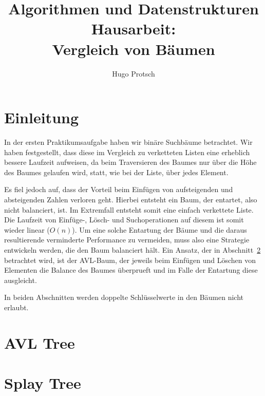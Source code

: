 \documentclass[11pt]{article}
\title{Algorithmen und Datenstrukturen Hausarbeit:\\Vergleich von Bäumen}
\author{Hugo Protsch}
\begin{document}
    \maketitle
    \tableofcontents
    \newpage
    \section{Einleitung}\label{sec:Einleitung}

    In der ersten Praktikumsaufgabe haben wir binäre Suchbäume betrachtet.
    Wir haben festgestellt, dass diese im Vergleich zu verketteten Listen eine erheblich
    bessere Laufzeit aufweisen, da beim Traversieren des Baumes nur über die
    Höhe des Baumes gelaufen wird, statt, wie bei der Liste, über jedes Element.

    Es fiel jedoch auf, dass der Vorteil beim Einfügen von aufsteigenden und
    absteigenden Zahlen verloren geht.
    Hierbei entsteht ein Baum, der entartet, also nicht balanciert, ist.
    Im Extremfall entsteht somit eine einfach verkettete Liste.
    Die Laufzeit von Einfüge-, Lösch- und Suchoperationen auf diesem
    ist somit wieder linear (\(O(n)\)).
    Um eine solche Entartung der Bäume und die daraus resultierende verminderte Performance
    zu vermeiden, muss also eine Strategie entwickeln werden, die den Baum balanciert hält.
    Ein Ansatz, der in Abschnitt~\ref{sec:avl-tree} betrachtet wird, ist der AVL-Baum,
    der jeweils beim Einfügen und Löschen von Elementen die
    Balance des Baumes überprueft und im Falle der Entartung diese ausgleicht.

    In beiden Abschnitten werden doppelte Schlüsselwerte in den Bäumen nicht
    erlaubt.


    \section{AVL Tree}\label{sec:avl-tree}
    


    \section{Splay Tree}\label{sec:splay-tree}
    
\end{document}
